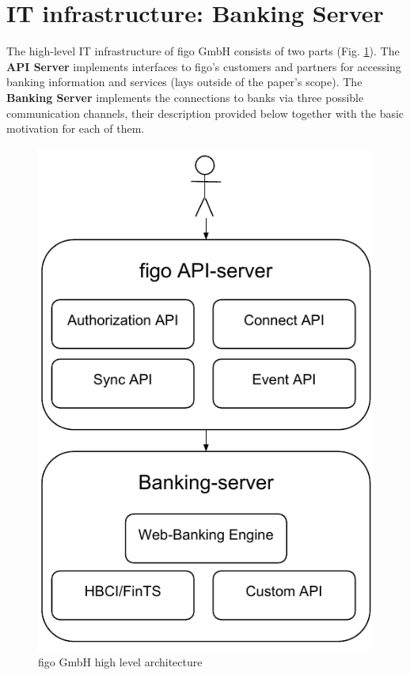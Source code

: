 \section{IT infrastructure: Banking Server}
\label{sec:infrastructure}
The high-level IT infrastructure of figo GmbH consists of two parts (Fig. \ref{fig:figoArch}). The \textbf{API Server} implements interfaces to figo's customers and partners for accessing banking information and services (lays outside of the paper's scope). The \textbf{Banking Server} implements the connections to banks via three possible communication channels, their description provided below together with the basic motivation for each of them.
\begin{figure}[ht]
  	\label{fig:figoArch}
    \centering
    \includegraphics[scale=0.7]{grafiken/figoArch}
     \caption{figo GmbH high level architecture}
\end{figure}

